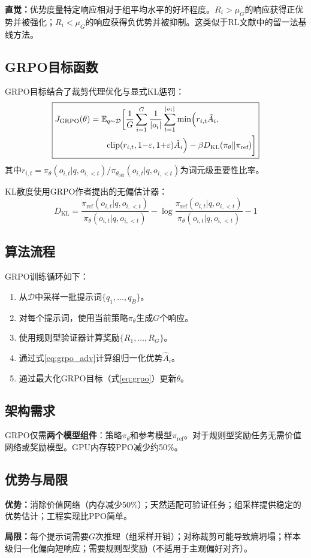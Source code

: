 \textbf{直觉：}优势度量特定响应相对于组平均水平的好坏程度。$R_i > \mu_G$的响应获得正优势并被强化；$R_i < \mu_G$的响应获得负优势并被抑制。这类似于RL文献中的留一法基线方法。

\subsection{GRPO目标函数}

GRPO目标结合了裁剪代理优化与显式KL惩罚：
\begin{equation}
\boxed{
\begin{aligned}
J_{\text{GRPO}}(\theta) = \mathbb{E}&_{q \sim \mathcal{D}}\biggl[\frac{1}{G}\sum_{i=1}^{G}\frac{1}{|o_i|}\sum_{t=1}^{|o_i|}\min\Bigl(r_{i,t}\hat{A}_i, \\
&\text{clip}(r_{i,t}, 1{-}\varepsilon, 1{+}\varepsilon)\hat{A}_i\Bigr) - \beta D_{\text{KL}}(\pi_\theta \| \pi_{\text{ref}})\biggr]
\end{aligned}
}
\label{eq:grpo}
\end{equation}
其中$r_{i,t} = \pi_\theta(o_{i,t}|q, o_{i,<t}) / \pi_{\theta_{\text{old}}}(o_{i,t}|q, o_{i,<t})$为词元级重要性比率。

KL散度使用GRPO作者提出的无偏估计器：
\begin{equation}
D_{\text{KL}} = \frac{\pi_{\text{ref}}(o_{i,t}|q, o_{i,<t})}{\pi_\theta(o_{i,t}|q, o_{i,<t})} - \log\frac{\pi_{\text{ref}}(o_{i,t}|q, o_{i,<t})}{\pi_\theta(o_{i,t}|q, o_{i,<t})} - 1
\end{equation}

\subsection{算法流程}

GRPO训练循环如下：
\begin{enumerate}[leftmargin=*, itemsep=1pt]
\item 从$\mathcal{D}$中采样一批提示词$\{q_1, \ldots, q_B\}$。
\item 对每个提示词，使用当前策略$\pi_\theta$生成$G$个响应。
\item 使用规则型验证器计算奖励$\{R_1, \ldots, R_G\}$。
\item 通过式\ref{eq:grpo_adv}计算组归一化优势$\hat{A}_i$。
\item 通过最大化GRPO目标（式\ref{eq:grpo}）更新$\theta$。
\end{enumerate}

\subsection{架构需求}

GRPO仅需\textbf{两个模型组件}：策略$\pi_\theta$和参考模型$\pi_{\text{ref}}$。对于规则型奖励任务无需价值网络或奖励模型。GPU内存较PPO减少约50\%。

\subsection{优势与局限}

\textbf{优势：}消除价值网络（内存减少50\%）；天然适配可验证任务；组采样提供稳定的优势估计；工程实现比PPO简单。

\textbf{局限：}每个提示词需要$G$次推理（组采样开销）；对称裁剪可能导致熵坍塌；样本级归一化偏向短响应；需要规则型奖励（不适用于主观偏好对齐）。
